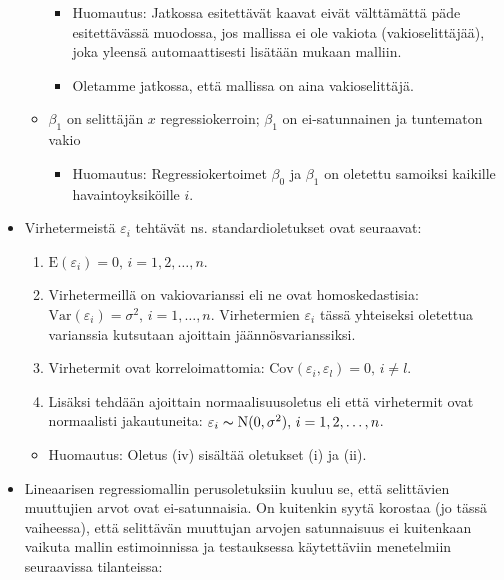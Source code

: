 \documentclass[
]{book}
\providecommand{\tightlist}{%
  \setlength{\itemsep}{0pt}\setlength{\parskip}{0pt}}
\begin{document}
\begin{itemize}
\begin{itemize}
    \begin{itemize}
    \tightlist
    \item
      Huomautus: Jatkossa esitettävät kaavat eivät välttämättä päde esitettävässä muodossa, jos mallissa ei ole vakiota (vakioselittäjää), joka yleensä automaattisesti lisätään mukaan malliin.
    \item
      Oletamme jatkossa, että mallissa on aina vakioselittäjä.
    \end{itemize}
  \item
    \(\beta_1\) on selittäjän \(x\) regressiokerroin; \(\beta_1\) on ei-satunnainen ja tuntematon vakio

    \begin{itemize}
    \tightlist
    \item
      Huomautus: Regressiokertoimet \(\beta_0\) ja \(\beta_1\) on oletettu samoiksi kaikille havaintoyksiköille \(i\).
    \end{itemize}
  \end{itemize}
\item
  Virhetermeistä \(\varepsilon_i\) tehtävät ns. standardioletukset ovat seuraavat:

  \begin{enumerate}
  \def\labelenumi{\roman{enumi})}
  \tightlist
  \item
    \(\text{E}(\varepsilon_i) = 0, \, i=1,2,\ldots,n\).
  \item
    Virhetermeillä on vakiovarianssi eli ne ovat homoskedastisia: \(\mathrm{Var}(\varepsilon_i)= \sigma^2, \, i=1,\ldots,n\). Virhetermien \(\varepsilon_i\) tässä yhteiseksi oletettua varianssia kutsutaan ajoittain jäännösvarianssiksi.
  \item
    Virhetermit ovat korreloimattomia: \(\mathrm{Cov}(\varepsilon_i, \varepsilon_l)=0, \, i \neq l\).
  \item
    Lisäksi tehdään ajoittain normaalisuusoletus eli että virhetermit ovat normaalisti jakautuneita: \(\varepsilon_i \thicksim \text{N}(0, \sigma^2), \, i=1,2,\ldots,n\).
  \end{enumerate}

  \begin{itemize}
  \tightlist
  \item
    Huomautus: Oletus (iv) sisältää oletukset (i) ja (ii).
  \end{itemize}
\item
  Lineaarisen regressiomallin perusoletuksiin kuuluu se, että selittävien muuttujien arvot ovat ei-satunnaisia. On kuitenkin syytä korostaa (jo tässä vaiheessa), että selittävän muuttujan arvojen satunnaisuus ei kuitenkaan vaikuta mallin estimoinnissa ja testauksessa käytettäviin menetelmiin seuraavissa tilanteissa:


\end{itemize}
\end{document}
